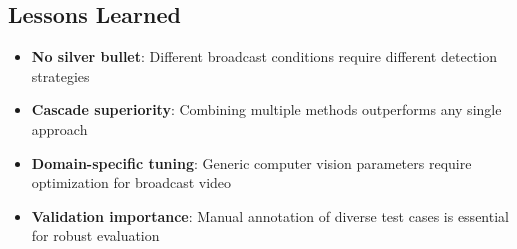 \documentclass[11pt,a4paper]{article}
\begin{document}
\subsection{Lessons Learned}

\begin{itemize}
    \item \textbf{No silver bullet}: Different broadcast conditions require different detection strategies
    \item \textbf{Cascade superiority}: Combining multiple methods outperforms any single approach
    \item \textbf{Domain-specific tuning}: Generic computer vision parameters require optimization for broadcast video
    \item \textbf{Validation importance}: Manual annotation of diverse test cases is essential for robust evaluation
\end{itemize}
\end{document}
